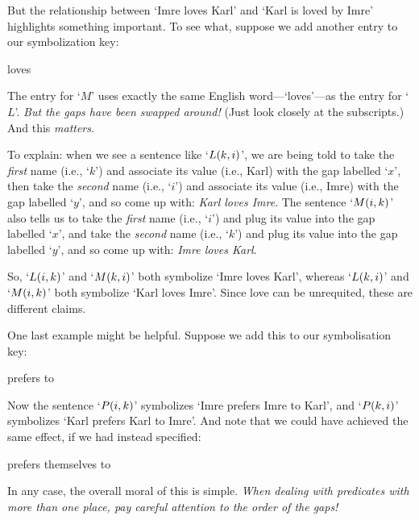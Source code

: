 But the relationship between `Imre loves Karl' and `Karl is loved by Imre' highlights something important. To see what, suppose we add another entry to our symbolization key:
\begin{ekey}
	\item[\atom{M}{x,y}]  loves 
\end{ekey}
The entry for `$M$' uses exactly the same English word---`loves'---as the entry for `$L$'. \emph{But the gaps have been swapped around!} (Just look closely at the subscripts.) And this \emph{matters}.

To explain: when we see a sentence like `$L(k,i)$', we are being told to take the \emph{first} name (i.e., `$k$') and associate its value (i.e., Karl) with the gap labelled `$x$', then take the \emph{second} name (i.e., `$i$') and associate its value (i.e., Imre) with the gap labelled `$y$', and so come up with: \emph{Karl loves Imre}. The sentence `$M(i,k)$' also tells us to take the \emph{first} name (i.e., `$i$') and plug its value into the gap labelled `$x$', and take the \emph{second} name (i.e., `$k$') and plug its value into the gap labelled `$y$', and so come up with: \emph{Imre loves Karl}.

So, `$L(i,k)$' and `$M(k,i)$' both symbolize `Imre loves Karl', whereas `$L(k,i)$' and `$M(i,k)$' both symbolize `Karl loves Imre'. Since love can be unrequited, these are different claims.

One last example might be helpful. Suppose we add this to our symbolisation key: 
\begin{ekey}
	\item[\atom{P}{x,y}]  prefers  to 
\end{ekey}
Now the sentence `$P(i,k)$' symbolizes `Imre prefers Imre to Karl', and `$P(k,i)$' symbolizes `Karl prefers Karl to Imre'.  And note that we could have achieved the same effect, if we had instead specified:
\begin{ekey}
	\item[\atom{P}{x,y}]  prefers themselves to 
\end{ekey}
In any case, the overall moral of this is simple. \emph{When dealing with predicates with more than one place, pay careful attention to the order of the gaps!} 


